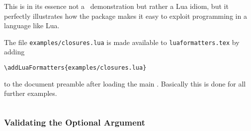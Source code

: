 \documentclass[12pt]{scrartcl}
\begin{document}
This is in its essence not a \luaformatters\ demonstration but rather a Lua idiom, but it perfectly illustrates how the package makes it easy to exploit programming in a language like Lua.

The file \texttt{examples/closures.lua} is made available to \texttt{luaformatters.tex} by adding

\begin{verbatim}
\addLuaFormatters{examples/closures.lua}
\end{verbatim}

\noindent to the document preamble after loading the main .  Basically this is done for all further examples.

\inputminted{lua}{examples/closure.lua}


\subsubsection{Validating the Optional Argument}
\label{sec:examples:validating-optional-argument}

\inputminted{lua}{examples/validate-options.lua}

\inputminted{tex}{examples/validate-options.tex}
\end{document}
